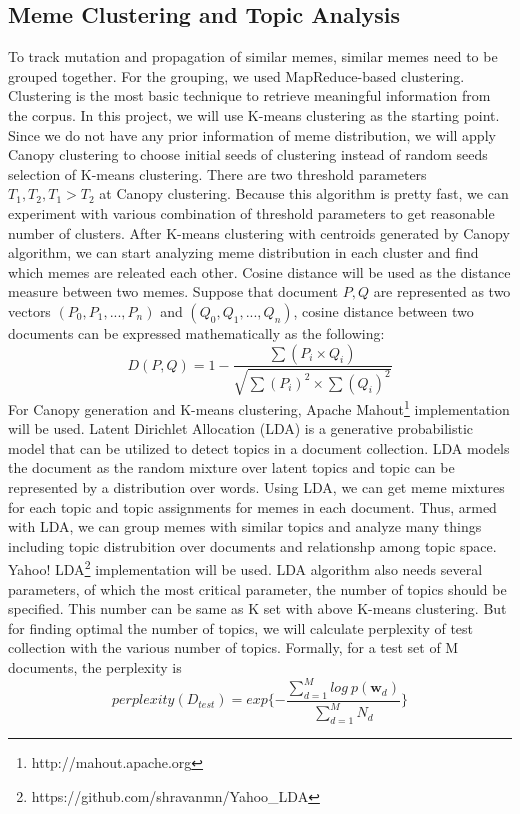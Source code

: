 \documentclass{sig-alternate}
\begin{document}
\subsection{Meme Clustering and Topic Analysis}
To track mutation and propagation of similar memes, similar memes need to be grouped together. For the grouping, we used MapReduce-based clustering. Clustering is the most basic technique to retrieve meaningful information from the corpus. In this project, we will use K-means clustering as the starting point. Since we do not have any prior information of meme distribution, we will apply Canopy clustering \cite{McCallum2000} to choose initial seeds of clustering instead of random seeds selection of K-means clustering. There are two threshold parameters $T_1,T_2,T_1>T_2$ at Canopy clustering. Because this algorithm is pretty fast, we can experiment with various combination of threshold parameters to get reasonable number of clusters. After K-means clustering with centroids generated by Canopy algorithm, we can start analyzing meme distribution in each cluster and find which memes are releated each other.
Cosine distance will be used as the distance measure between two memes. Suppose that document $P,Q$ are represented as two vectors $(P_0, P_1,...,P_n)$ and $(Q_0, Q_1,...,Q_n)$, cosine distance between two documents can be expressed mathematically as the following:
\begin{displaymath}
D(P,Q)=1-\frac{\sum(P_i \times Q_i)}{\sqrt{\sum{(P_i)^2} \times \sum{(Q_i)^2}}}
\end{displaymath}
For Canopy generation and K-means clustering, Apache Mahout\footnote{http://mahout.apache.org} implementation will be used. 
Latent Dirichlet Allocation (LDA)\cite{Blei2003} is a generative probabilistic model that can be utilized to detect topics in a document collection. LDA models the document as the random mixture over latent topics and topic can be represented by a distribution over words. Using LDA, we can get meme mixtures for each topic and topic assignments for memes in each document. Thus, armed with LDA, we can group memes with similar topics and analyze many things including topic distrubition over documents and relationshp among topic space. Yahoo! LDA\footnote{https://github.com/shravanmn/Yahoo\_LDA}  implementation will be used. LDA algorithm also needs several parameters, of which the most critical parameter, the number of topics should be specified. This number can be same as K set with above K-means clustering. But for finding optimal the number of topics, we will calculate perplexity of test collection with the various number of topics. Formally, for a test set of M documents, the perplexity is
\begin{displaymath}
 perplexity(D_{test})=exp\{-\frac{\sum_{d=1}^M log\ p(\mathbf{w}_d)}{\sum_{d=1}^M N_d}\}
\end{displaymath}
\end{document}
